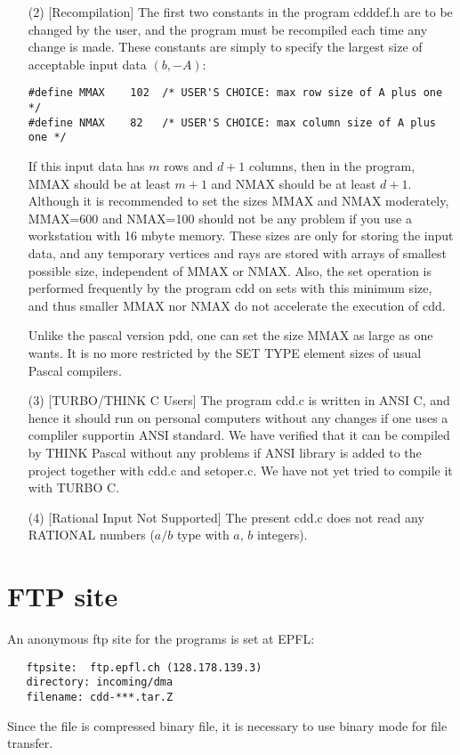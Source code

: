 \begin{itemize}
\item[(2)] [Recompilation] The first two constants in the program cdddef.h are to be 
changed by the user, and the program must be recompiled
each time any change is made.   These constants are simply
to specify the largest size of acceptable input data $(b, -A)$: 
\begin{verbatim}
#define MMAX    102  /* USER'S CHOICE: max row size of A plus one */
#define NMAX    82   /* USER'S CHOICE: max column size of A plus one */
\end{verbatim}
If this input data has $m$ rows and $d+1$ columns, then in the program,
MMAX should be at least $m+1$ and NMAX should be at least
$d+1$.  Although it is recommended to set the sizes MMAX and NMAX moderately, 
MMAX=600 and NMAX=100 should not be any problem if you use a workstation with 16 mbyte memory.
These sizes are only for storing the input data, and 
any temporary vertices and rays are stored with
arrays of smallest possible size, independent of MMAX or NMAX.  
Also, the set operation is performed frequently
by the program cdd on sets with this minimum size, and thus smaller MMAX nor NMAX
do not accelerate the execution of cdd.

Unlike the pascal version pdd, one can set the size MMAX as large as one
wants.  It is no more restricted by the SET TYPE element sizes of 
usual Pascal compilers.

\item[(3)] [TURBO/THINK C Users] The program cdd.c is written in
ANSI C, and hence it should run on
personal computers without any changes if one uses a compliler supportin
ANSI standard. We have verified that it can be compiled by THINK Pascal without
any problems if ANSI library is added to the project together with
cdd.c and setoper.c.  We have not yet tried to compile it with TURBO C.

\item[(4)] [Rational Input Not Supported] The present cdd.c does not
read any RATIONAL numbers ($a/b$ type with $a$, $b$ integers).

\end{itemize}

\section{FTP site}  \label{FTP}
An anonymous ftp site for the programs is set at EPFL:
\begin{verbatim}
   ftpsite:  ftp.epfl.ch (128.178.139.3)
   directory: incoming/dma
   filename: cdd-***.tar.Z
\end{verbatim}
Since the file is compressed binary file, it is necessary to use binary mode for
file transfer.


